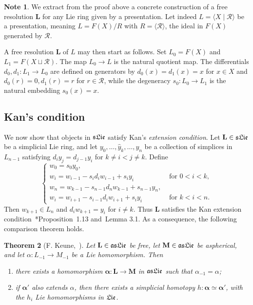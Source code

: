 \documentclass[a4paper,reqno,notitlepage]{amsart}
\newtheorem{theorem}{Theorem}[section]
\theoremstyle{definition}
\newtheorem{note}[theorem]{Note}
\begin{document}
\begin{note}\label{note:free resolution}
  We extract from the proof above a concrete construction of a free
  resolution $\mathbf L$ for any Lie ring given by a presentation. Let
  indeed $L=\langle X\mid\mathscr R\rangle$ be a presentation, meaning
  $L=F(X)/R$ with $R=\langle\mathscr R\rangle$, the ideal in $F(X)$
  generated by $\mathscr R$.

  A free resolution $\mathbf L$ of $L$ may then start as follows. Set
  $L_0=F(X)$ and $L_1=F(X\sqcup\mathscr R)$. The map $L_0\to L$ is the
  natural quotient map. The differentials $d_0,d_1:L_1\to L_0$ are
  defined on generators by $d_0(x)=d_1(x)=x$ for $x\in X$ and
  $d_0(r)=0,d_1(r)=r$ for $r\in\mathscr R$, while the degeneracy
  $s_0:L_0\to L_1$ is the natural embedding $s_0(x)=x$.
\end{note}

\subsection{Kan's condition}
We now show that objects in $\mathfrak{sLie}$ satisfy Kan's \emph{extension
  condition}. Let $\mathbf L\in \mathfrak{sLie}$ be a simplicial Lie ring, and
let $y_0,\ldots,\hat{y}_k ,\ldots,y_n$ be a collection of simplices in
$L_{n-1}$ satisfying $d_iy_j=d_{j-1}y_i $ for $k\neq i<j\neq
k$. Define
\[\begin{cases}
  w_0=s_0y_0,\\
  w_i=w_{i-1}-s_id_iw_{i-1}+s_iy_i & \text{ for }0<i<k,\\
  w_n=w_{k-1}-s_{n-1}d_nw_{k-1}+s_{n-1}y_n,\\
  w_i=w_{i+1}-s_{i-1}d_iw_{i+1}+s_iy_i &\text{ for }k<i<n.
\end{cases}
\]
Then $w_{k+1}\in L_n$ and $d_iw_{k+1}=y_i$ for $i\neq k$.  Thus
$\mathbf L$ satisfies the Kan extension
condition~\cite{Curtis:71}*{Proposition~1.13 and~Lemma 3.1}.  As a
consequence, the following comparison theorem holds.
\begin{theorem}[F. Keune,~\cite{Keune:73}]\label{thm:comparison}
  Let $\mathbf L\in\mathfrak{asLie}$ be free, let $\mathbf M\in\mathfrak{asLie}$ be
  aspherical, and let $\alpha:L_{-1}\to M_{-1}$ be a Lie
  homomorphism. Then
  \begin{enumerate}
  \item there exists a homomorphism $\boldsymbol\alpha:\mathbf L\to
    \mathbf M$ in $\mathfrak{asLie}$ such that $\alpha_{-1}=\alpha$;
  \item if $\boldsymbol\alpha'$ also extends $\alpha$, then there
    exists a simplicial homotopy
    $h:\boldsymbol\alpha\simeq\boldsymbol\alpha'$, with the $h_i$ Lie
    homomorphisms in $\mathfrak{Lie}$.
  \end{enumerate}
\end{theorem}
\end{document}
